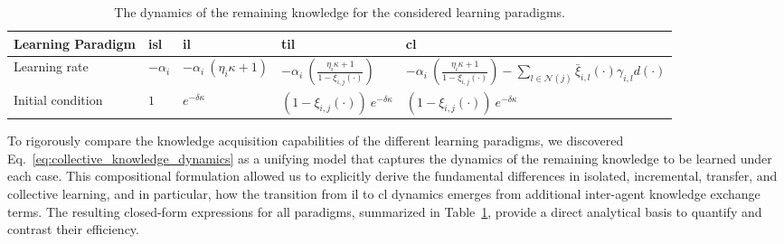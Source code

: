 \documentclass[12pt]{article}
\begin{document}
\begin{table}[!t]
    \caption{The dynamics of the remaining knowledge for the considered learning paradigms.\label{tab:learning_paradigms_expressions}}
    \begin{center}
        \begin{adjustbox}{width=\textwidth}
            \begin{tabular}{
                >{\raggedright\arraybackslash}p{3cm} 
                *{3}{>{\centering\arraybackslash}p{3cm}}
                *{1}{>{\centering\arraybackslash}p{6.5cm}}
            }            
                \toprule
                \textbf{Learning Paradigm} 
                & \textbf{\ac{isl}} 
                & \textbf{\ac{il}} 
                & \textbf{\ac{til}} 
                & \textbf{\ac{cl}} \\
                \midrule
                Learning rate 
                & $-\alpha_i$ 
                & $-\alpha_i\:\left(\eta_i \kappa + 1 \right)$ 
                & $-\alpha_i\:\left( \frac{\eta_i \kappa + 1}{1 - \xi_{i,j}(\cdot)} \right)$ 
                & $-\alpha_i\:\left( \frac{\eta_i \kappa + 1}{1 - \xi_{i,j}(\cdot)} \right) - \sum_{l \in \mathcal{N}(j)}\bar{\xi}_{i,l}(\cdot)\gamma_{i,l}d(\cdot)$ \\
                \addlinespace[0.5ex]
                Initial condition 
                & $1$ 
                & $e^{-\delta \kappa}$ 
                & $\left(1-\xi_{i,j}(\cdot)\right)\: e^{-\delta \kappa}$ 
                & $\left(1-\xi_{i,j}(\cdot)\right)\: e^{-\delta \kappa}$ \\
                \bottomrule
            \end{tabular}
        \end{adjustbox}
    \end{center}
\end{table}

To rigorously compare the knowledge acquisition capabilities of the different learning paradigms, we discovered Eq.~\eqref{eq:collective_knowledge_dynamics} as a unifying model that captures the dynamics of the remaining knowledge to be learned under each case. This compositional formulation allowed us to explicitly derive the fundamental differences in isolated, incremental, transfer, and collective learning, and in particular, how the transition from \ac{il} to \ac{cl} dynamics emerges from additional inter-agent knowledge exchange terms. The resulting closed-form expressions for all paradigms, summarized in Table~\ref{tab:learning_paradigms_expressions}, provide a direct analytical basis to quantify and contrast their efficiency.
\end{document}
